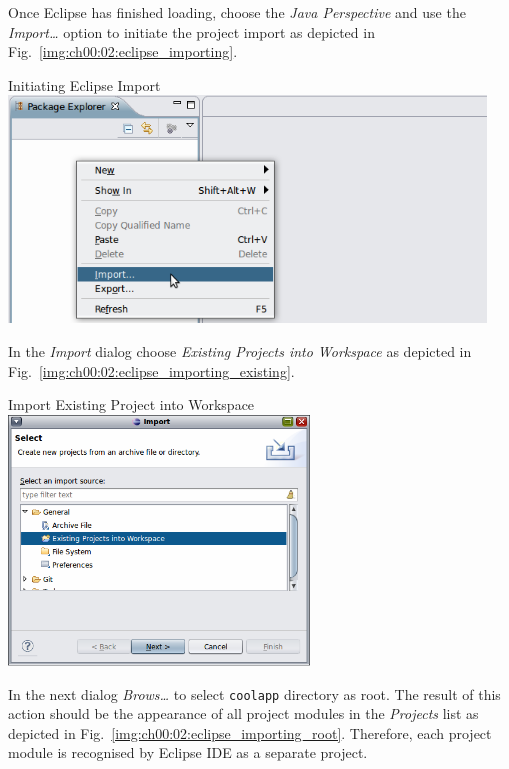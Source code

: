   Once Eclipse has finished loading, choose the \emph{Java Perspective} and use the \emph{Import\ldots} option to initiate the project import as depicted in Fig.~\ref{img:ch00:02:eclipse_importing}.
  
  \begin{image}{Initiating Eclipse Import}{\label{img:ch00:02:eclipse_importing}}    
    \includegraphics[width=0.95\textwidth]{parts/00-part/chapters/01-application-modules/images/08-eclipse-importing.png}
  \end{image}

  In the \emph{Import} dialog choose \emph{Existing Projects into Workspace} as depicted in Fig.~\ref{img:ch00:02:eclipse_importing_existing}.

  \begin{image}{Import Existing Project into Workspace}{\label{img:ch00:02:eclipse_importing_existing}}        
    \includegraphics[width=0.6\textwidth]{parts/00-part/chapters/01-application-modules/images/09-eclipse-importing.png}
  \end{image}

  In the next dialog \emph{Brows\ldots} to select \texttt{coolapp} directory as root.
  The result of this action should be the appearance of all project modules in the \emph{Projects} list as depicted in Fig.~\ref{img:ch00:02:eclipse_importing_root}.  
  Therefore, each project module is recognised by Eclipse IDE as a separate project.
  
